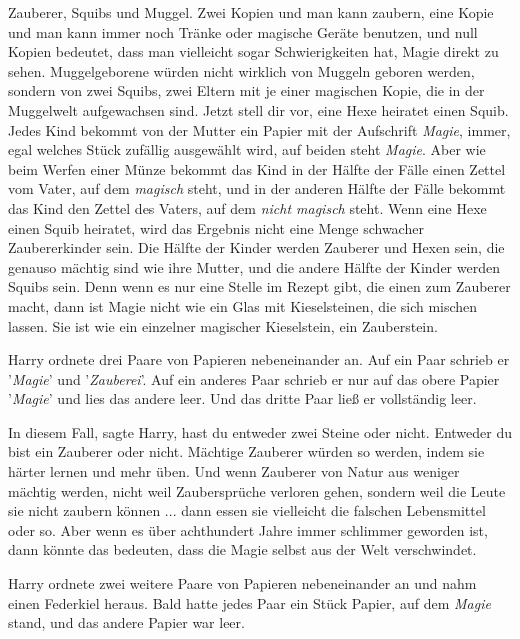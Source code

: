 Zauberer, Squibs und Muggel. Zwei Kopien und man kann zaubern, eine Kopie und
man kann immer noch Tränke oder magische Geräte benutzen, und null Kopien
bedeutet, dass man vielleicht sogar Schwierigkeiten hat, Magie direkt zu sehen.
Muggelgeborene würden nicht wirklich von Muggeln geboren werden, sondern von
zwei Squibs, zwei Eltern mit je einer magischen Kopie, die in der Muggelwelt
aufgewachsen sind. Jetzt stell dir vor, eine Hexe heiratet einen Squib. Jedes
Kind bekommt von der Mutter ein Papier mit der Aufschrift \glqq{}
\emph{Magie}\grqq{}, immer, egal welches Stück zufällig ausgewählt wird, auf
beiden steht \glqq{}\emph{Magie}\grqq{}. Aber wie beim Werfen einer Münze
bekommt das Kind in der Hälfte der Fälle einen Zettel vom Vater, auf dem \glqq{}
\emph{magisch}\grqq{} steht, und in der anderen Hälfte der Fälle bekommt das
Kind den Zettel des Vaters, auf dem \emph{\glqq{}nicht magisch\grqq{}} steht.
Wenn eine Hexe einen Squib heiratet, wird das Ergebnis nicht eine Menge
schwacher Zaubererkinder sein. Die Hälfte der Kinder werden Zauberer und Hexen
sein, die genauso mächtig sind wie ihre Mutter, und die andere Hälfte der Kinder
werden Squibs sein. Denn wenn es nur eine Stelle im Rezept gibt, die einen zum
Zauberer macht, dann ist Magie nicht wie ein Glas mit Kieselsteinen, die sich
mischen lassen. Sie ist wie ein einzelner magischer Kieselstein, ein
Zauberstein.\grqq{}

Harry ordnete drei Paare von Papieren nebeneinander an. Auf ein Paar schrieb er
'\emph{Magie}' und '\emph{Zauberei}'. Auf ein anderes Paar schrieb er nur auf
das obere Papier '\emph{Magie}' und lies das andere leer. Und das dritte Paar
ließ er vollständig leer.

\glqq{}In diesem Fall\grqq{}, sagte Harry, \glqq{}hast du entweder zwei Steine
oder nicht. Entweder du bist ein Zauberer oder nicht. Mächtige Zauberer würden
so werden, indem sie härter lernen und mehr üben. Und wenn Zauberer von Natur
aus weniger mächtig werden, nicht weil Zaubersprüche verloren gehen, sondern
weil die Leute sie nicht zaubern können ... dann essen sie vielleicht die
falschen Lebensmittel oder so. Aber wenn es über achthundert Jahre immer
schlimmer geworden ist, dann könnte das bedeuten, dass die Magie selbst aus der
Welt verschwindet.\grqq{}

Harry ordnete zwei weitere Paare von Papieren nebeneinander an und nahm einen
Federkiel heraus. Bald hatte jedes Paar ein Stück Papier, auf dem \glqq{}
\emph{Magie}\grqq{} stand, und das andere Papier war leer.

